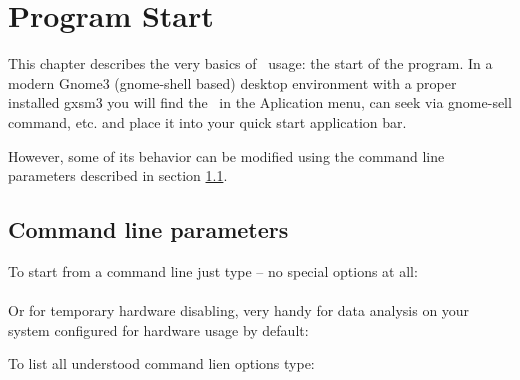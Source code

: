 

\chapter{Program Start}
\label{ch:start}

This chapter describes the very basics of \Gxsm\ usage: the start of the program.
In a modern Gnome3 (gnome-shell based) desktop environment with a proper installed gxsm3 you will find
the \Gxsm\ in the Aplication menu, can seek via gnome-sell command, etc. and place
it into your quick start application bar.

However, some of its behavior can be modified using the command line parameters described in section
\ref{sec:start:command-line-pars}.

\section{Command line parameters}
\label{sec:start:command-line-pars}
To start from a command line just type -- no special options at all:\\
\\
Or for temporary hardware disabling, very handy for data analysis on your system configured for hardware usage by default:\\

 To list all understood command lien options type:

